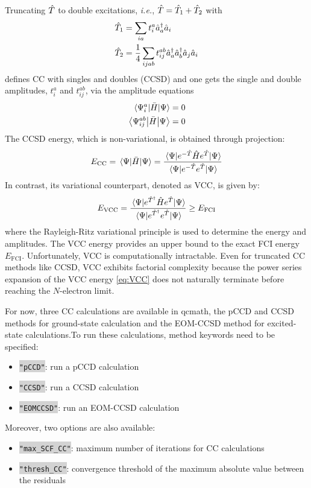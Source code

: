 \documentclass[aip,jcp,reprint,noshowkeys,superscriptaddress]{revtex4-1}
\newcommand{\ie}{\textit{i.e.}}
\newcommand{\hT}{\Hat{T}}
\newcommand{\keyword}[1]{{\colorbox{lightgray}{\texttt{#1}}}}
\begin{document}
Truncating $\hT$ to double excitations, \ie, $\hT = \hT_1 + \hT_2$ with 
\begin{subequations}
\begin{align}
	\hT_1 & = \sum_{ia} t_{i}^{a} \Hat{a}_a^{\dag} \Hat{a}_i
        \\
	\hT_2 & = \frac{1}{4} \sum_{ijab} t_{ij}^{ab} \Hat{a}_a^{\dag} \Hat{a}_b^{\dag} \Hat{a}_j \Hat{a}_i
\end{align}
\end{subequations}
defines CC with singles and doubles (CCSD) and one gets the single and double amplitudes, $t_{i}^{a}$ and $t_{ij}^{ab}$, via the amplitude equations
\begin{subequations}
\begin{align}
	\label{eq:T1_eq}
	\mel{\Psi_{i}^{a}}{\Bar{H}}{\Psi} & = 0
	\\
	\label{eq:T2_eq}
	\mel{\Psi_{ij}^{ab}}{\Bar{H}}{\Psi} & = 0
\end{align}
\end{subequations}
The CCSD energy, which is non-variational, is obtained through projection:
\begin{equation}
	E_\text{CC}
	= \mel{\Psi}{\bar{H}}{\Psi}
	= \frac{ \mel{\Psi}{ e^{-\hat{T}} \hat{H} e^{\hat{T}} } {\Psi} }{ \mel{\Psi}{ e^{-\hat{T}} e^{\hat{T}} }{\Psi} }
\end{equation}
In contrast, its variational counterpart, denoted as VCC, is given by:
\begin{equation}
\label{eq:VCC}
	E_\text{VCC}
	= \frac{\mel{\Psi}{e^{\hat{T}^\dagger} \hat{H} e^{\hat{T}}}{\Psi}}{\mel{\Psi}{e^{\hat{T}^\dagger} e^{\hat{T}}}{\Psi}}
	\ge E_\text{FCI}
\end{equation}
where the Rayleigh-Ritz variational principle is used to determine the energy and amplitudes. The VCC energy provides an upper bound to the exact FCI energy $E_\text{FCI}$. Unfortunately, VCC is computationally intractable. Even for truncated CC methods like CCSD, VCC exhibits factorial complexity because the power series expansion of the VCC energy \eqref{eq:VCC} does not naturally terminate before reaching the $N$-electron limit.

For now, three CC calculations are available in qcmath, the pCCD and CCSD methods for ground-state calculation and the EOM-CCSD method for excited-state calculations.To run these calculations,  method keywords need to be specified:
\begin{itemize}
\item \keyword{"pCCD"}: run a pCCD calculation
\item \keyword{"CCSD"}: run a CCSD calculation
\item \keyword{"EOMCCSD"}: run an EOM-CCSD calculation
\end{itemize}
Moreover, two options are also available:
\begin{itemize}
\item \keyword{"max\_SCF\_CC"}: maximum number of iterations for CC calculations
\item \keyword{"thresh\_CC"}: convergence threshold of the maximum absolute value between the residuals
\end{itemize}
\end{document}
